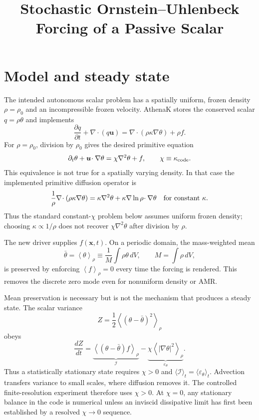 \documentclass[10pt]{article}
\title{Stochastic Ornstein--Uhlenbeck Forcing of a Passive Scalar}
\author{}
\date{}
\newcommand{\avg}[1]{\left\langle #1\right\rangle_\rho}
\begin{document}
\maketitle
\vspace{-2em}

\section{Model and steady state}

The intended autonomous scalar problem has a spatially uniform, frozen density
$\rho=\rho_0$ and an incompressible frozen velocity.  AthenaK stores the
conserved scalar $q=\rho\theta$ and implements
\begin{equation}
  \frac{\partial q}{\partial t}
  + \nabla\!\cdot(q\boldsymbol{u})
  = \nabla\!\cdot(\rho\kappa\nabla\theta)+\rho f .
  \label{eq:conservative}
\end{equation}
For $\rho=\rho_0$, division by $\rho_0$ gives the desired primitive equation
\begin{equation}
  \partial_t\theta+\boldsymbol{u}\!\cdot\nabla\theta
  =\chi\nabla^2\theta+f,\qquad \chi\equiv\kappa_{\rm code}.
  \label{eq:scalar}
\end{equation}
This equivalence is not true for a spatially varying density.  In that case
the implemented primitive diffusion operator is
\begin{equation}
 \frac{1}{\rho}\nabla\!\cdot(\rho\kappa\nabla\theta)
 =\kappa\nabla^2\theta+\kappa\nabla\ln\rho\!\cdot\nabla\theta
 \quad\hbox{for constant }\kappa .
\end{equation}
Thus the standard constant-$\chi$ problem below assumes uniform frozen
density; choosing $\kappa\propto1/\rho$ does not recover
$\chi\nabla^2\theta$ after division by $\rho$.

The new driver supplies $f(\boldsymbol{x},t)$.  On a periodic domain, the
mass-weighted mean
\begin{equation}
  \bar{\theta}=\avg{\theta}
  \equiv \frac{1}{M}\int\rho\theta\,dV,\qquad
  M=\int\rho\,dV ,
\end{equation}
is preserved by enforcing $\avg{f}=0$ every time the forcing is rendered.
This removes the discrete zero mode even for nonuniform density or AMR.

Mean preservation is necessary but is not the mechanism that produces a
steady state.  The scalar variance
\begin{equation}
  Z=\frac{1}{2}\avg{(\theta-\bar{\theta})^2}
\end{equation}
obeys
\begin{equation}
  \frac{dZ}{dt}
  = \underbrace{\avg{(\theta-\bar{\theta})f}}_{\mathcal I}
  - \underbrace{\chi\avg{|\nabla\theta|^2}}_{\varepsilon_\theta}.
  \label{eq:budget}
\end{equation}
Thus a statistically stationary state requires $\chi>0$ and
$\langle\mathcal I\rangle_t=\langle\varepsilon_\theta\rangle_t$.  Advection transfers
variance to small scales, where diffusion removes it.  The controlled
finite-resolution experiment therefore uses $\chi>0$.  At $\chi=0$, any
stationary balance in the code is numerical unless an inviscid dissipative
limit has first been established by a resolved $\chi\to0$ sequence.
\end{document}
